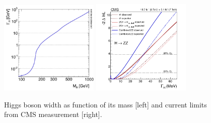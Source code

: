 \begin{figure}[!Hhtbp]
  \begin{center}
    \includegraphics[width=0.42\textwidth]{figs/u0g5o.png}
    \includegraphics[width=0.42\textwidth]{figs/AllFitPaper_30_04_14_MeV.png}
    \caption{Higgs boson width as function of its mass [left] and current limits from CMS measurement [right].}
    \label{fig:WidthHiggs}
  \end{center}
\end{figure}




